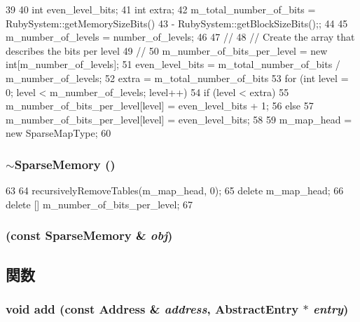 \begin{DoxyCode}
39 {
40     int even_level_bits;
41     int extra;
42     m_total_number_of_bits = RubySystem::getMemorySizeBits() 
43         - RubySystem::getBlockSizeBits();;
44 
45     m_number_of_levels = number_of_levels;
46 
47     //
48     // Create the array that describes the bits per level
49     //
50     m_number_of_bits_per_level = new int[m_number_of_levels];
51     even_level_bits = m_total_number_of_bits / m_number_of_levels;
52     extra = m_total_number_of_bits %
53     for (int level = 0; level < m_number_of_levels; level++) {
54         if (level < extra)
55             m_number_of_bits_per_level[level] = even_level_bits + 1;
56         else
57             m_number_of_bits_per_level[level] = even_level_bits;
58     }
59     m_map_head = new SparseMapType;
60 }
\end{DoxyCode}
\hypertarget{classSparseMemory_a5c1f4b825e7960e579acfd4ac79675c6}{
\subsubsection[{$\sim$SparseMemory}]{\setlength{\rightskip}{0pt plus 5cm}$\sim${\bf SparseMemory} ()}}
\label{classSparseMemory_a5c1f4b825e7960e579acfd4ac79675c6}



\begin{DoxyCode}
63 {
64     recursivelyRemoveTables(m_map_head, 0);
65     delete m_map_head;
66     delete [] m_number_of_bits_per_level;
67 }
\end{DoxyCode}
\hypertarget{classSparseMemory_a4185cf6bae110327c9ce0225a731a7a8}{
\subsubsection[{SparseMemory}]{ (const {\bf SparseMemory} \& {\em obj})}}
\label{classSparseMemory_a4185cf6bae110327c9ce0225a731a7a8}


\subsection{関数}
\hypertarget{classSparseMemory_aceb8ef4c1228ddad10036f5e59d61ea9}{
\subsubsection[{add}]{\setlength{\rightskip}{0pt plus 5cm}void add (const {\bf Address} \& {\em address}, \/  {\bf AbstractEntry} $\ast$ {\em entry})}}
\label{classSparseMemory_aceb8ef4c1228ddad10036f5e59d61ea9}



